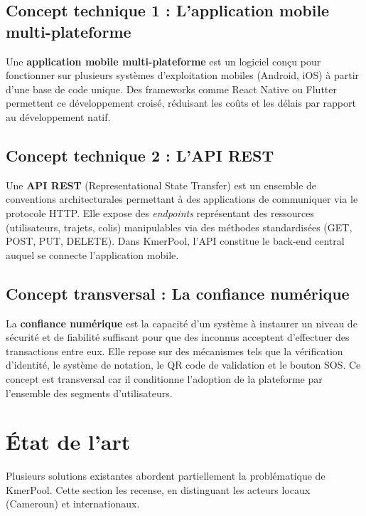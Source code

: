 \documentclass[12pt, a4paper]{report}
\begin{document}
\subsection{Concept technique 1 : L'application mobile multi-plateforme}

Une \textbf{application mobile multi-plateforme} est un logiciel conçu pour fonctionner
sur plusieurs systèmes d'exploitation mobiles (Android, iOS) à partir d'une base de
code unique. Des frameworks comme React Native ou Flutter permettent ce développement
croisé, réduisant les coûts et les délais par rapport au développement natif.

\subsection{Concept technique 2 : L'\ac{API} \ac{REST}}

Une \textbf{\ac{API} \ac{REST}} (Representational State Transfer) est un ensemble de
conventions architecturales permettant à des applications de communiquer via le protocole
\ac{HTTP}. Elle expose des \textit{endpoints} représentant des ressources (utilisateurs,
trajets, colis) manipulables via des méthodes standardisées (GET, POST, PUT, DELETE).
Dans KmerPool, l'\ac{API} constitue le back-end central auquel se connecte l'application
mobile.

\subsection{Concept transversal : La confiance numérique}

La \textbf{confiance numérique} est la capacité d'un système à instaurer un niveau
de sécurité et de fiabilité suffisant pour que des inconnus acceptent d'effectuer des
transactions entre eux. Elle repose sur des mécanismes tels que la vérification
d'identité, le système de notation, le \ac{QR} code de validation et le bouton \ac{SOS}.
Ce concept est transversal car il conditionne l'adoption de la plateforme par l'ensemble
des segments d'utilisateurs.

\section{État de l'art}

Plusieurs solutions existantes abordent partiellement la problématique de KmerPool.
Cette section les recense, en distinguant les acteurs locaux (Cameroun) et
internationaux.
\end{document}
